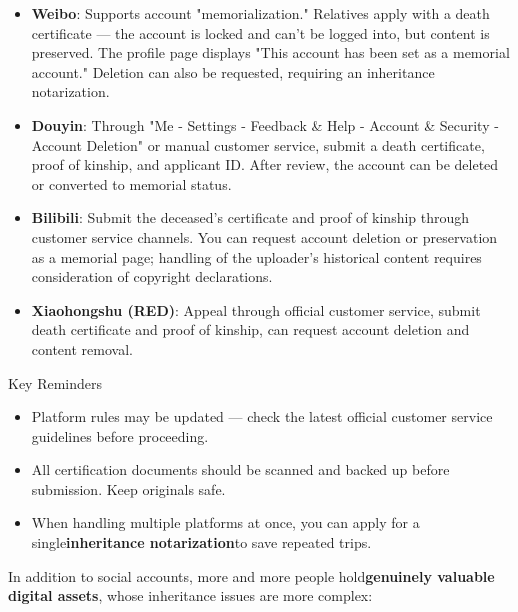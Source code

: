 \begin{itemize}
  \item \textbf{Weibo}: Supports account "memorialization." Relatives apply with a death certificate — the account is locked and can't be logged into, but content is preserved. The profile page displays "This account has been set as a memorial account." Deletion can also be requested, requiring an inheritance notarization.
  \item \textbf{Douyin}: Through "Me - Settings - Feedback \& Help - Account \& Security - Account Deletion" or manual customer service, submit a death certificate, proof of kinship, and applicant ID. After review, the account can be deleted or converted to memorial status.
  \item \textbf{Bilibili}: Submit the deceased's certificate and proof of kinship through customer service channels. You can request account deletion or preservation as a memorial page; handling of the uploader's historical content requires consideration of copyright declarations.
  \item \textbf{Xiaohongshu (RED)}: Appeal through official customer service, submit death certificate and proof of kinship, can request account deletion and content removal.
\end{itemize}

\begin{tcbinfo}{Key Reminders}
\begin{itemize}
  \item Platform rules may be updated — check the latest official customer service guidelines before proceeding.
  \item All certification documents should be scanned and backed up before submission. Keep originals safe.
  \item When handling multiple platforms at once, you can apply for a single\textbf{inheritance notarization}to save repeated trips.
\end{itemize}

\end{tcbinfo}


In addition to social accounts, more and more people hold\textbf{genuinely valuable digital assets}, whose inheritance issues are more complex:

